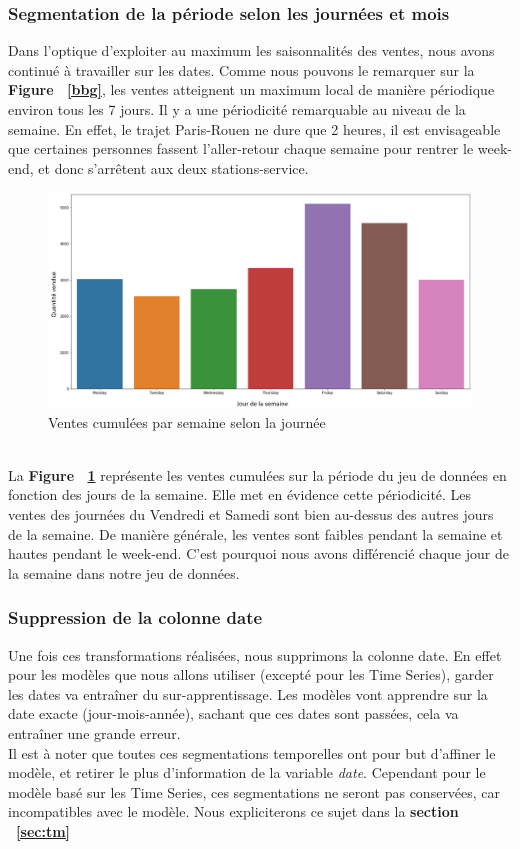 \documentclass{article} %
\begin{document}
\subsubsection{Segmentation de la période selon les journées et mois}
Dans l'optique d'exploiter au maximum les saisonnalités des ventes, nous avons continué à travailler sur les dates. Comme nous pouvons le remarquer sur la \textbf{Figure ~\ref{bbg}}, les ventes atteignent un maximum local de manière périodique environ tous les 7 jours. Il y a une périodicité remarquable au niveau de la semaine. En effet, le trajet Paris-Rouen ne dure que 2 heures, il est envisageable que certaines personnes fassent l'aller-retour chaque semaine pour rentrer le week-end, et donc s'arrêtent aux deux stations-service.\\
\begin{figure}[!h]
	\centering
	\includegraphics[keepaspectratio = true,scale=0.65]{vente_week.png}
	\caption{Ventes cumulées par semaine selon la journée}
	\label{bb1}
\end{figure}
~\\
La \textbf{Figure ~\ref{bb1}} représente les ventes cumulées sur la période du jeu de données en fonction des jours de la semaine. Elle met en évidence cette périodicité. Les ventes des journées du Vendredi et Samedi sont bien au-dessus des autres jours de la semaine. De manière générale, les ventes sont faibles pendant la semaine et hautes pendant le week-end. C'est pourquoi nous avons différencié chaque jour de la semaine dans notre jeu de données.\\
\subsubsection{Suppression de la colonne date}
Une fois ces transformations réalisées, nous supprimons la colonne date. En effet pour les modèles que nous allons utiliser (excepté pour les Time Series), garder les dates va entraîner du sur-apprentissage. Les modèles vont apprendre sur la date exacte (jour-mois-année), sachant que ces dates sont passées, cela va entraîner une grande erreur.\\
Il est à noter que toutes ces segmentations temporelles ont pour but d'affiner le modèle, et retirer le plus d'information de la variable \textit{date}. Cependant pour le modèle basé sur les Time Series, ces segmentations ne seront pas conservées, car incompatibles avec le modèle. Nous expliciterons ce sujet dans la \textbf{section ~\ref{sec:tm}}
\end{document}

